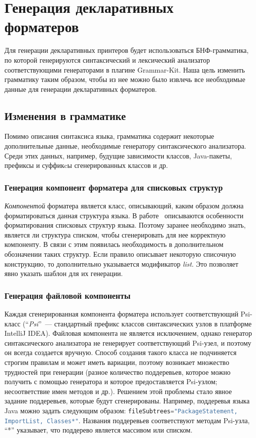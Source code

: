 \documentclass[conference]{IEEEtran}
\begin{document}
\section{Генерация декларативных форматеров}
Для генерации декларативных принтеров будет использоваться БНФ-грамматика, по которой генерируются синтаксический и лексический анализатор соответствующими генераторами в плагине Grammar-Kit.
Наша цель изменить грамматику таким образом, чтобы из нее можно было извлечь все необходимые данные для генерации декларативных форматеров.
\subsection{Изменения в грамматике}
Помимо описания синтаксиса языка, грамматика содержит некоторые дополнительные данные, необходимые генератору синтаксического анализатора.
Среди этих данных, например, будущие зависимости классов, Java-пакеты, префиксы и суффикcы сгенерированных классов и др.

\subsubsection*{Генерация компонент форматера для списковых структур}
\emph{Компонентой} форматера является класс, описывающий, каким образом должна форматироваться данная структура языка.
В работе~\cite{while} описываются особенности форматирования списковых структур языка.
Поэтому заранее необходимо знать, является ли структура списком, чтобы сгенерировать для нее корректную компоненту.
В связи с этим появилась необходимость в дополнительном обозначении таких структур.
Если правило описывает некоторую списочную конструкцию, то дополнительно указывается модификатор \emph{list}.
Это позволяет явно указать шаблон для их генерации.

\subsubsection*{Генерация файловой компоненты}
Каждая сгенерированная компонента форматера использует соответствующий Psi-класс (``\emph{Psi}''~--- стандартный префикс классов синтаксических узлов в платформе IntelliJ IDEA).
Файловая компонента не является исключением, однако генератор синтаксического анализатора не генерирует соответствующий Psi-узел, и поэтому он всегда создается вручную.
Способ создания такого класса не подчиняется строгим правилам и может иметь вариации, поэтому возникает множество трудностей при генерации (разное количество поддеревьев, которое можно получить с помощью генератора и которое предоставляется Psi-узлом; несоответствие имен методов и др.).
Решением этой проблемы стало явное задание поддеревьев, которые будут сгенерированы.
Например, поддеревья языка Java можно задать следующим образом: \lstinline[language=java]{fileSubtrees="PackageStatement, ImportList, Classes*"}.
Названия поддеревьев соответствуют методам Psi-узла, ``*'' указывает, что поддерево является массивом или списком.
\end{document}
